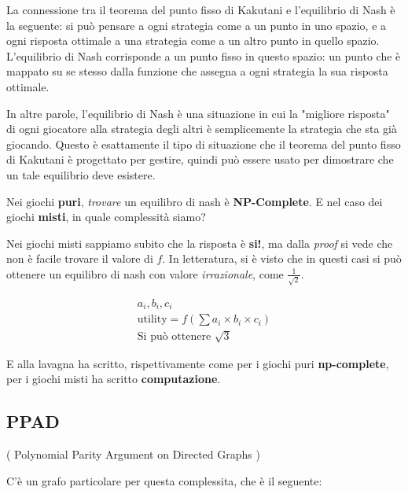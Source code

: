 La connessione tra il teorema del punto fisso di Kakutani e l'equilibrio di
Nash è la seguente: si può pensare a ogni strategia come a un punto in uno
spazio, e a ogni risposta ottimale a una strategia come a un altro punto in
quello spazio. L'equilibrio di Nash corrisponde a un punto fisso in questo
spazio: un punto che è mappato su se stesso dalla funzione che assegna a ogni
strategia la sua risposta ottimale.

In altre parole, l'equilibrio di Nash è una situazione in cui la "migliore
risposta" di ogni giocatore alla strategia degli altri è semplicemente la
strategia che sta già giocando. Questo è esattamente il tipo di situazione che
il teorema del punto fisso di Kakutani è progettato per gestire, quindi può
essere usato per dimostrare che un tale equilibrio deve esistere.

Nei giochi \textbf{puri}, \textit{trovare} un equilibro di nash è
\textbf{NP-Complete}. E nel caso dei giochi \textbf{misti}, in quale
complessità siamo?

Nei giochi misti sappiamo subito che la risposta è \textbf{si!}, ma dalla
\textit{proof} si vede che non è facile trovare il valore di $f$. In
letteratura, si è visto che in questi casi si può ottenere un equilibro di nash
con valore \textit{irrazionale}, come $\frac{1}{\sqrt{2}}$.

\begin{equation}
    \begin{aligned}
        a_i , b_i, c_i                                     \\
        \text{utility} = f(\sum a_i \times b_i \times c_i) \\
        \text{Si può ottenere } \sqrt{3}
    \end{aligned}
\end{equation}

E alla lavagna ha scritto, rispettivamente come per i giochi puri
\textbf{np-complete}, per i giochi misti ha scritto \textbf{computazione}.

\subsection{PPAD} ( Polynomial Parity Argument on Directed Graphs )

C'è un grafo particolare per questa complessita, che è il seguente:


